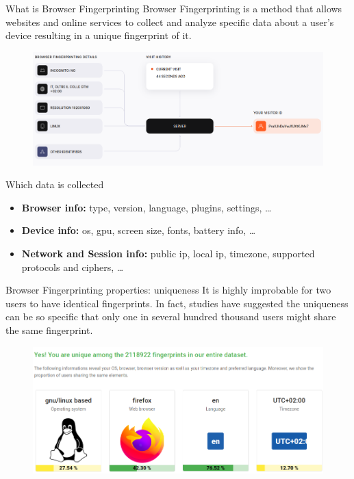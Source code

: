 \begin{frame}{What is Browser Fingerprinting}
  Browser Fingerprinting is a method that allows websites and online services to collect and analyze specific data about a user's device resulting in a unique fingerprint of it.
  \begin{figure}
    \centering
    \includegraphics[width=\linewidth]{images/fingerprint.png}
  \end{figure}
\end{frame}

\begin{frame}{Which data is collected}
  \begin{itemize}
    \item \textbf{Browser info:} type, version, language, plugins, settings, \dots
    \item \textbf{Device info:} os, gpu, screen size, fonts, battery info, \dots
    \item \textbf{Network and Session info:} public ip, local ip, timezone, supported protocols and ciphers, \dots
  \end{itemize}
\end{frame}

\begin{frame}{Browser Fingerprinting properties: uniqueness}
  It is highly improbable for two users to have identical fingerprints.
  In fact, studies have suggested the uniqueness can be so specific that only one in several hundred thousand users might share the same fingerprint.

  \begin{figure}
    \centering
    \includegraphics[width=\linewidth]{images/uniqueness.png}
  \end{figure}
\end{frame}

